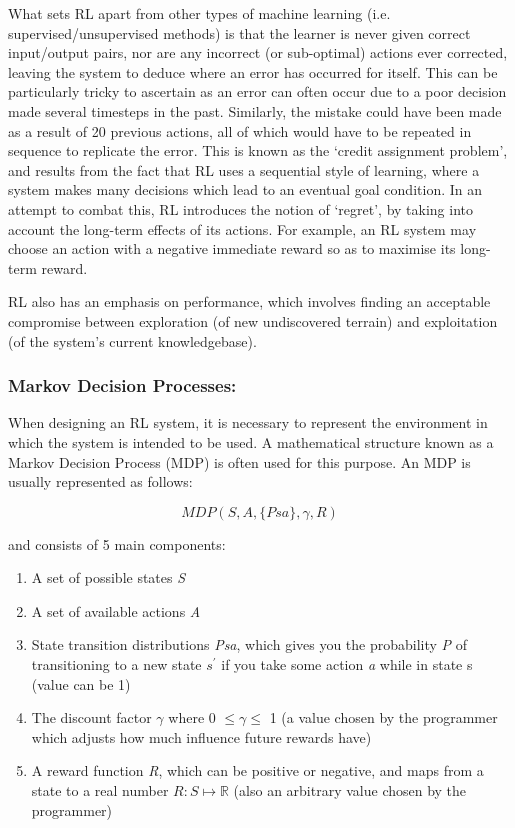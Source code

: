 \documentclass[a4paper,oneside]{report}
\begin{document}
What sets RL apart from other types of machine learning (i.e. supervised/unsupervised methods) is that the learner is never given correct input/output pairs, nor are any incorrect (or sub-optimal) actions ever corrected, leaving the system to deduce where an error has occurred for itself. This can be particularly tricky to ascertain as an error can often occur due to a poor decision made several timesteps in the past. Similarly, the mistake could have been made as a result of 20 previous actions, all of which would have to be repeated in sequence to replicate the error. This is known as the `credit assignment problem', and results from the fact that RL uses a sequential style of learning, where a system makes many decisions which lead to an eventual goal condition. In an attempt to combat this, RL introduces the notion of `regret', by taking into account the long-term effects of its actions. For example, an RL system may choose an action with a negative immediate reward so as to maximise its long-term reward.  

RL also has an emphasis on performance, which involves finding an acceptable compromise between exploration (of new undiscovered terrain) and exploitation (of the system's current knowledgebase).

\subsubsection{Markov Decision Processes:}

When designing an RL system, it is necessary to represent the environment in which the system is intended to be used. A mathematical structure known as a Markov Decision Process (MDP) is often used for this purpose. An MDP is usually represented as follows:

\begin{equation*}
MDP(S, A, \{Psa\}, \gamma, R)
\end{equation*}

\noindent and consists of 5 main components: 

\begin{enumerate}
	\item A set of possible states \emph{S}
	\item A set of available actions \emph{A}
	\item State transition distributions \emph{Psa}, which gives you the probability \emph{P} of transitioning to a new state \emph{$s^\prime$} if you take some action \emph{a} while in state {s} (value can be 1)
	\item The discount factor $\gamma$ where 0 $\leq \gamma \leq$ 1 (a value chosen by the programmer which adjusts how much influence future rewards have)
	\item A reward function \emph{R}, which can be positive or negative, and maps from a state to a real number $R : S \mapsto \mathbb{R}$ (also an arbitrary value chosen by the programmer)
\end{enumerate}
\end{document}

